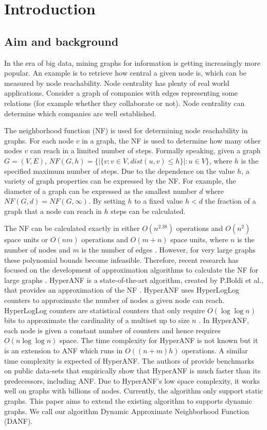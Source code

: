 \chapter{Introduction}

\section{Aim and background}
In the era of big data, mining graphs for information is getting increasingly more popular. An example is to retrieve how central a given node is, which can be measured by node reachability. Node centrality has plenty of real world applications. Consider a graph of companies with edges representing some relations (for example whether they collaborate or not). Node centrality can determine which companies are well established. 

The neighborhood function (NF) is used for determining node reachability in graphs. For each node $v$ in a graph, the NF is used to determine how many other nodes $v$ can reach in a limited number of steps. Formally speaking, given a graph $G = (V,E)$, $NF(G,h) = \{|\{v : v \in V, dist(u,v) \leq h \}| : u \in V\}$, where $h$ is the specified maximum number of steps. Due to the dependence on the value $h$, a variety of graph properties can be expressed by the NF. For example, the diameter of a graph can be expressed as the smallest number $d$ where $NF(G,d) = NF(G,\infty)$. By setting $h$ to a fixed value $h < d$ the fraction of a graph that a node can reach in $h$ steps can be calculated.

The NF can be calculated exactly in either $O(n^{2.38})$ operations and $O(n^2)$ space units or $O(nm)$ operations and $O(m + n)$ space units, where $n$ is the number of nodes and $m$ is the number of edges \cite{Palmer01}. However, for very large graphs these polynomial bounds become infeasible. Therefore, recent research has focused on the development of approximation algorithms to calculate the NF for large graphs \cite{Palmer01,hyperanf,anf}. HyperANF is a state-of-the-art algorithm, created by P.Boldi et al., that provides an approximation of the NF \cite{hyperanf}. HyperANF uses HyperLogLog counters to approximate the number of nodes a given node can reach. HyperLogLog counters are statistical counters that only require $O( \log\log n)$ bits to approximate the cardinality of a multiset up to size $n$ \cite{hyperloglog}. In HyperANF, each node is given a constant number of counters and hence requires $O(n \log\log n)$ space. The time complexity for HyperANF is not known but it is an extension to ANF which runs in $O((n+m)h)$ operations. A similar time complexity is expected of HyperANF. The authors of \cite{hyperanf} provide benchmarks on public data-sets that empirically show that HyperANF is much faster than its predecessors, including ANF. Due to HyperANF's low space complexity, it works well on graphs with billions of nodes. Currently, the algorithm only support  static graphs. This paper aims to extend the existing algorithm to supports dynamic graphs. We call our algorithm Dynamic Approximate Neighborhood Function (DANF).

